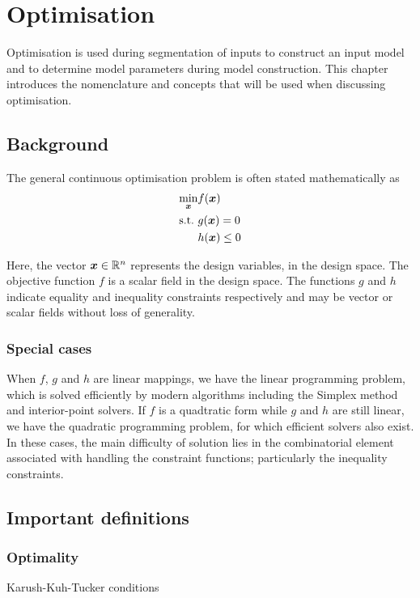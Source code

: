 \chapter{Optimisation}
\begin{overview}
  Optimisation is used during segmentation of inputs to construct an input model and to determine model parameters during model construction.
  This chapter introduces the nomenclature and concepts that will be used when discussing optimisation.
\end{overview}

\section{Background}
The general continuous optimisation problem is often stated mathematically as
\begin{align}
  \label{eq:nonlinear_optmisation}
  \min_{\boldsymbol{x}} &  f(\boldsymbol{x}) \\
   \text{s.t.~} & g(\boldsymbol{x}) = 0 \\
 & h(\boldsymbol{x}) \leq 0
\end{align}

Here, the vector $\boldsymbol{x} \in \mathbb{R}^n$ represents the design variables, in the design space.  
The objective function $f$ is a scalar field in the design space.
The functions $g$ and $h$ indicate equality and inequality constraints respectively and may be vector or scalar fields without loss of generality.

\subsection{Special cases}
When $f$, $g$ and $h$ are linear mappings, we have the linear programming problem, which is solved efficiently by modern algorithms including the Simplex method and interior-point solvers.  
If $f$ is a quadtratic form while $g$ and $h$ are still linear, we have the quadratic programming problem, for which efficient solvers also exist.  
In these cases, the main difficulty of solution lies in the combinatorial element associated with handling the constraint functions; particularly the inequality constraints.


\section{Important definitions}
\subsection{Optimality}
Karush-Kuh-Tucker conditions

